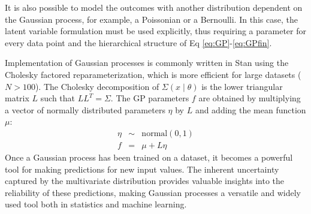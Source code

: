 It is also possible to model the outcomes with another distribution dependent on the Gaussian process, for example, a
Poissonian or a Bernoulli. In this case, the latent variable formulation must be used explicitly, thus requiring a
parameter for every data point and the hierarchical structure of Eq \ref{eq:GP}-\ref{eq:GPfin}.

Implementation of Gaussian processes is commonly written in Stan using the Cholesky
factored reparameterization, which is more efficient for large datasets (\(N > 100\)). The Cholesky decomposition of
\(\Sigma(x \mid \theta)\) is the lower triangular matrix \(L\) such that \(LL^T = \Sigma\). The GP parameters \(f\)
are obtained by multiplying a vector of normally distributed parameters \(\eta\) by \(L\) and adding the mean function
$\mu$:
\begin{eqnarray}
\eta &\sim &\text{normal}(0,1)  \\
f&=&\mu + L\eta
\end{eqnarray}
Once a Gaussian process has been trained on a dataset, it becomes a powerful tool for making predictions for new input
values. The inherent uncertainty captured by the multivariate distribution provides valuable insights into the reliability of these predictions, making Gaussian processes a versatile and widely used tool both in statistics and machine learning.

